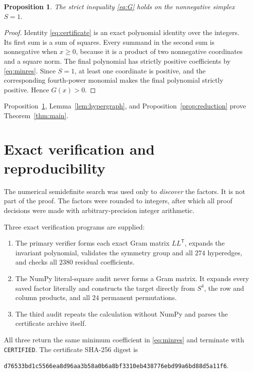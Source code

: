 \documentclass[11pt]{article}
\newtheorem{proposition}[theorem]{Proposition}
\begin{document}
\begin{proposition}\label{prop:face}
The strict inequality \eqref{eq:G} holds on the nonnegative simplex $S=1$.
\end{proposition}

\begin{proof}
Identity \eqref{eq:certificate} is an exact polynomial identity over the integers. Its first sum is a sum of squares. Every summand in the second sum is nonnegative when $x\ge0$, because it is a product of two nonnegative coordinates and a square norm. The final polynomial has strictly positive coefficients by \eqref{eq:minres}. Since $S=1$, at least one coordinate is positive, and the corresponding fourth-power monomial makes the final polynomial strictly positive. Hence $G(x)>0$.
\end{proof}

Proposition~\ref{prop:face}, Lemma~\ref{lem:hypergraph}, and Proposition~\ref{prop:reduction} prove Theorem~\ref{thm:main}.

\section{Exact verification and reproducibility}
The numerical semidefinite search was used only to \emph{discover} the factors. It is not part of the proof. The factors were rounded to integers, after which all proof decisions were made with arbitrary-precision integer arithmetic.

Three exact verification programs are supplied:
\begin{enumerate}[nosep]
 \item The primary verifier forms each exact Gram matrix $LL^{\mathsf T}$, expands the invariant polynomial, validates the symmetry group and all $274$ hyperedges, and checks all $2380$ residual coefficients.
 \item The NumPy literal-square audit never forms a Gram matrix. It expands every saved factor literally and constructs the target directly from $S^4$, the row and column products, and all $24$ permanent permutations.
 \item The third audit repeats the calculation without NumPy and parses the certificate archive itself.
\end{enumerate}
All three return the same minimum coefficient in \eqref{eq:minres} and terminate with \texttt{CERTIFIED}. The certificate SHA-256 digest is
\begin{center}
\texttt{d76533bd1c5566ea8d96aa3b58a0b6a8bf3310eb438776ebd99a6bd88d5a11f6}.
\end{center}
\end{document}
